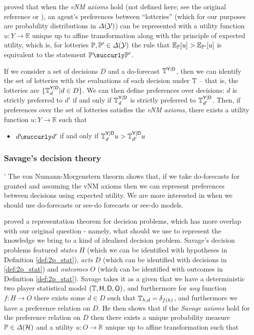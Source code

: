 \citet{von_neumann_theory_1944} proved that when the \emph{vNM axioms} hold (not defined here; see the original reference or \citet{steele_decision_2020}), an agent's preferences between ``lotteries'' (which for our purposes are probability distributions in $\Delta(\mathcal{Y})$) can be represented with a utility function $u:Y\to \mathbb{R}$ unique up to affine transformation along with the principle of expected utility, which is, for lotteries $\mathbb{P},\mathbb{P}'\in\Delta(\mathcal{Y})$ the rule that $\mathbb{E}_{\mathbb{P}}[u]> \mathbb{E}_{\mathbb{P}'}[u]$ is equivalent to the statement $\prob{P} \succurly \prob{P}'$.

If we consider a set of decisions $D$ and a do-forecast $\mathbb{T}^{\mathsf{Y}|\mathsf{{D}}}$, then we can identify the set of lotteries with the evaluations of each decision under $\mathbb{T}$ -- that is, the lotteries are $\{\mathbb{T}^{\mathsf{Y}|\mathsf{D}}_d|d\in D\}$. We can then define preferences over decisions: $d$ is strictly preferred to $d'$ if and only if $\mathbb{T}_{d}^{\mathsf{Y}|\mathsf{D}}$ is strictly preferred to $\mathbb{T}_{d'}^{\mathsf{Y}|\mathsf{D}}$. Then, if preferences over the set of lotteries satisfies the \emph{vNM axioms}, there exists a utility function $u:Y\to \mathbb{R}$ such that
\begin{itemize}
    \item $d\succurly d'$ if and only if $\mathbb{T}_d^{\mathsf{Y}|\mathsf{D}}u>\mathbb{T}_{d'}^{\mathsf{Y}|\mathsf{D}}u$
\end{itemize}


\subsubsection{Savage's decision theory}
'
The von Numann-Morgenstern theorm shows that, if we take do-forecasts for granted and assuming the vNM axioms then we can represent preferences between decisions using expected utility. We are more interested in when we should use do-forecasts or see-do forecasts or see-do models. 

\citet{savage_foundations_1954} proved a representation theorem for decision problems, which has more overlap with our original question - namely, what should we use to represent the knowledge we bring to a kind of idealised decision problem. Savage's decision problems featured \emph{states} $H$ (which we can be identified with hypotheses in Definition \ref{def:2p_stat}), \emph{acts} $D$ (which can be identified with decisions in \ref{def:2p_stat}) and \emph{outcomes} $O$ (which can be identified with outcomes in Definition \ref{def:2p_stat}). Savage takes it as a given that we have a deterministic two player statistical model $(\mathbb{T},\mathsf{H},\mathsf{D},\mathsf{O})$, and furthermore for \emph{any} function $f:H\to O$ there exists some $d\in D$ such that $\mathbb{T}_{h,d} = \delta_{f(h)}$, and furthermore we have a preference relation on $D$. He then shows that if the \emph{Savage axioms} hold for the preference relation on $D$ then there exists a unique probability measure $\mathbb{P}\in \Delta(\mathcal{H})$ and a utility $u:O\to \mathbb{R}$ unique up to affine transformation such that

